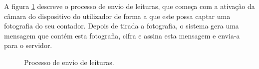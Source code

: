 A figura \ref{fig:state_envio} descreve o processo de envio de leituras, que começa com a ativação da câmara do dispositivo do utilizador de forma a que este possa captar uma fotografia do seu contador. Depois de tirada a fotografia, o sistema gera uma mensagem que contém esta fotografia, cifra e assina esta mensagem e envia-a para o servidor.

\begin{figure}[ht!]
\begin{center}
\caption{Processo de envio de leituras.}
\label{fig:state_envio}
\end{center}
\end{figure}












